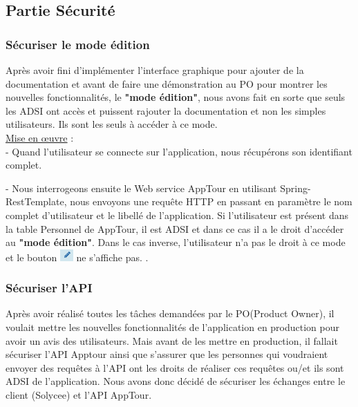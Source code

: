\documentclass[12pt]{article}
\begin{document}
\subsection{Partie Sécurité}

\subsubsection{Sécuriser le mode édition}
	
	Après avoir fini d'implémenter l'interface graphique pour ajouter de la documentation et avant de faire une démonstration au PO pour montrer les nouvelles fonctionnalités, le \textbf{"mode édition"}, nous avons fait en sorte que seuls les ADSI ont accès et puissent rajouter la documentation et non les simples utilisateurs. Ils sont les seuls à accéder à ce mode.\\   
  
  
\underline{Mise en œuvre} : \\
- Quand l'utilisateur se connecte sur l'application, nous récupérons son identifiant complet.

- Nous interrogeons ensuite le Web service AppTour en utilisant  Spring-RestTemplate\footnotemark, nous envoyons une requête HTTP en passant en paramètre le nom complet d'utilisateur et le libellé de l'application. Si l'utilisateur est présent dans la table Personnel de AppTour, il est ADSI et dans ce cas il a le droit d'accéder au \textbf{"mode édition"}. Dans le cas inverse, l'utilisateur n'a pas le droit à ce mode et le bouton \includegraphics[width=5mm,scale=0.5]{diagrammes/Bouton_modeEdition.png} ne s'affiche pas.
.\\


\subsubsection{Sécuriser l'API}

Après avoir réalisé toutes les tâches demandées par le PO(Product Owner), il voulait mettre les nouvelles fonctionnalités de l'application en production pour avoir un avis des utilisateurs. Mais avant de les mettre en production, il fallait sécuriser l'API Apptour ainsi que s'assurer que les personnes qui voudraient envoyer des requêtes à l'API ont les droits de réaliser ces requêtes ou/et ils sont ADSI de l'application. Nous avons donc décidé de sécuriser les échanges entre le client (Solycee) et l'API AppTour. 
\end{document}
